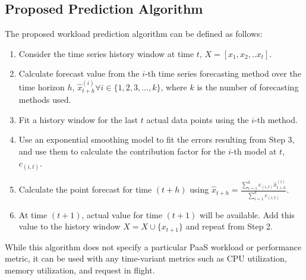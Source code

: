 \subsection{Proposed Prediction Algorithm}
The proposed workload prediction algorithm can be defined as follows:
\begin{enumerate}
\item Consider the time series history window at time $t$, $X=[x_{1},x_{2},.. x_{t}]$.
\item Calculate forecast value from the $i$-th time series forecasting method over the time horizon $h$, $\hat{x}_{t+h}^{(i)} \forall i \in \{1,2,3,...,k\}$, where $k$ is the number of forecasting methods used.
\item Fit a history window for the last $t$ actual data points using the $i$-th method.
\item Use an exponential smoothing model to fit the errors resulting from Step 3, and use them to calculate the contribution factor for the $i$-th model at $t$, $c_{(i,t)}$.
\item Calculate the point forecast for time $(t+h)$ using
$\hat{x}_{t+h}= \frac{\sum_{i=1}^{k}c_{(i,t)} \hat{x}_{t+h}^{(i)}}{\sum_{i=1}^{k}c_{(i,t)}}$.
\item At time $(t+1)$, actual value for time $(t+1)$ will be available. Add this value to the history window $X=X\cup \{x_{t+1}\}$ and repeat from Step 2.
\end{enumerate}
While this algorithm does not specify a particular PaaS workload or performance metric, it can be used with any time-variant metrics such as CPU utilization, memory utilization, and request in flight.\\